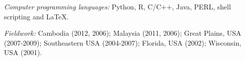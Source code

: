 \myHangIndent
{\sffamily\itshape Computer programming languages:} Python, R, C/C++, Java,
PERL, shell scripting and \LaTeX.

\myHangIndent
{\sffamily\itshape Fieldwork:} Cambodia (2012, 2006); Malaysia (2011, 2006);
Great Plains, USA (2007-2009); Southeastern USA (2004-2007); Florida, USA
(2002); Wisconsin, USA (2001).

